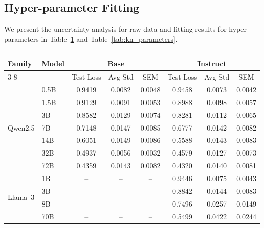 \subsection{Hyper-parameter Fitting}
We present the uncertainty analysis for raw data and fitting results for hyper parameters in Table~\ref{tab:uncertainty_comparison} and Table~\ref{tab:kn_parameters}.
\label{app:fitting_4_KE}
\begin{table}[tb]
\centering
\begin{tabular}{llcccccc}
\hline
\multirow{2}{*}{\textbf{Family}} & \multirow{2}{*}{\textbf{Model}} & \multicolumn{3}{c}{\textbf{Base}} & \multicolumn{3}{c}{\textbf{Instruct}} \\
\cline{3-8}
& & Test Loss & Avg Std & SEM & Test Loss & Avg Std & SEM \\
\hline
\multirow{7}{*}{Qwen2.5} & 0.5B & 0.9419 & 0.0082 & 0.0048 & 0.9458 & 0.0073 & 0.0042 \\
& 1.5B & 0.9129 & 0.0091 & 0.0053 & 0.8988 & 0.0098 & 0.0057 \\
& 3B & 0.8582 & 0.0129 & 0.0074 & 0.8281 & 0.0112 & 0.0065 \\
& 7B & 0.7148 & 0.0147 & 0.0085 & 0.6777 & 0.0142 & 0.0082 \\
& 14B & 0.6051 & 0.0149 & 0.0086 & 0.5588 & 0.0143 & 0.0083 \\
& 32B & 0.4937 & 0.0056 & 0.0032 & 0.4579 & 0.0127 & 0.0073 \\
& 72B & 0.4359 & 0.0143 & 0.0082 & 0.4320 & 0.0140 & 0.0081 \\
\hline
\multirow{4}{*}{Llama~3} & 1B & -- & -- & -- & 0.9446 & 0.0075 & 0.0043 \\
& 3B & -- & -- & -- & 0.8842 & 0.0144 & 0.0083 \\
& 8B & -- & -- & -- & 0.7496 & 0.0257 & 0.0149 \\
& 70B & -- & -- & -- & 0.5499 & 0.0422 & 0.0244 \\
\hline
\end{tabular}
\caption{}
\label{tab:uncertainty_comparison}
\end{table}

